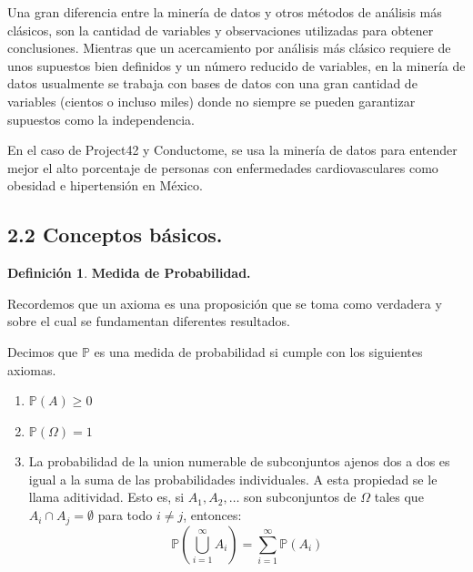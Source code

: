 \documentclass[
 12pt,
 letterpaper,
]{article}
\theoremstyle{teoremaBreak}
\theoremstyle{plain}
\theoremstyle{definition}
\newtheorem{definicion}[teorema]{Definición}
\begin{document}
Una gran diferencia entre la minería de datos y otros métodos de
análisis más clásicos, son la cantidad de variables y observaciones
utilizadas para obtener conclusiones. Mientras que un acercamiento por
análisis más clásico requiere de unos supuestos bien definidos y un
número reducido de variables, en la minería de datos usualmente se
trabaja con bases de datos con una gran cantidad de variables (cientos o
incluso miles) donde no siempre se pueden garantizar supuestos como la
independencia.

En el caso de Project42 y Conductome, se usa la minería de datos para
entender mejor el alto porcentaje de personas con enfermedades
cardiovasculares como obesidad e hipertensión en México.

\subsection{2.2 Conceptos básicos.}\label{conceptos-buxe1sicos.}
\begin{definicion}
\textbf{Medida de Probabilidad.}

Recordemos que un axioma es una proposición que se toma como verdadera y
sobre el cual se fundamentan diferentes resultados. 

Decimos que $\mathbb{P}$ es una
medida de probabilidad si cumple con los siguientes axiomas.

\begin{enumerate}
\def\labelenumi{\arabic{enumi}.}
\item
  $\mathbb{P}(A) \geq 0$
\item
  $\mathbb{P}(\Omega) = 1$
\item
  La probabilidad de la union numerable de subconjuntos ajenos dos a dos
  es igual a la suma de las probabilidades individuales. A esta
  propiedad se le llama aditividad. Esto es, si $A_1, A_2, \ldots$ son subconjuntos de $\Omega$ tales que
   $A_i \cap A_j = \emptyset$ para todo $i \neq j$, entonces:
  \[
  \mathbb{P}\left(\bigcup_{i=1}^{\infty} A_i\right) = \sum_{i=1}^{\infty} \mathbb{P}(A_i)
  \]
\end{enumerate} 
\end{definicion}
\medskip
\end{document}
